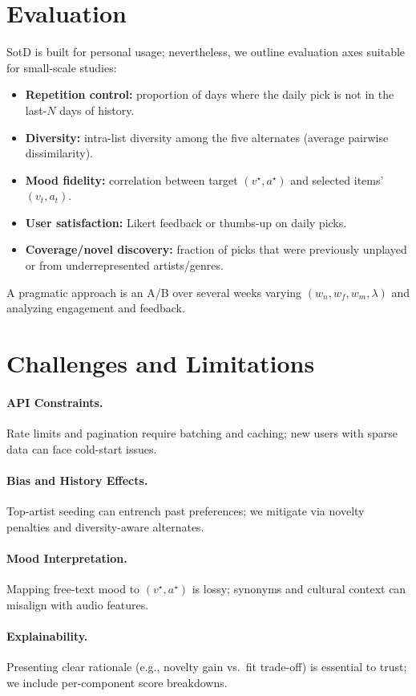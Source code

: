 \documentclass[11pt]{article}
\begin{document}
\section{Evaluation}
SotD is built for personal usage; nevertheless, we outline evaluation axes suitable for small-scale studies:
\begin{itemize}[leftmargin=*]
  \item \textbf{Repetition control:} proportion of days where the daily pick is not in the last-$N$ days of history.
  \item \textbf{Diversity:} intra-list diversity among the five alternates (average pairwise dissimilarity).
  \item \textbf{Mood fidelity:} correlation between target $(v^\star,a^\star)$ and selected items' $(v_t,a_t)$.
  \item \textbf{User satisfaction:} Likert feedback or thumbs-up on daily picks.
  \item \textbf{Coverage/novel discovery:} fraction of picks that were previously unplayed or from underrepresented artists/genres.
\end{itemize}
A pragmatic approach is an A/B over several weeks varying $(w_n,w_f,w_m,\lambda)$ and analyzing engagement and feedback.

\section{Challenges and Limitations}
\paragraph{API Constraints.} Rate limits and pagination require batching and caching; new users with sparse data can face cold-start issues.\\
\paragraph{Bias and History Effects.} Top-artist seeding can entrench past preferences; we mitigate via novelty penalties and diversity-aware alternates.\\
\paragraph{Mood Interpretation.} Mapping free-text mood to $(v^\star,a^\star)$ is lossy; synonyms and cultural context can misalign with audio features.\\
\paragraph{Explainability.} Presenting clear rationale (e.g., novelty gain vs.\ fit trade-off) is essential to trust; we include per-component score breakdowns.
\end{document}
